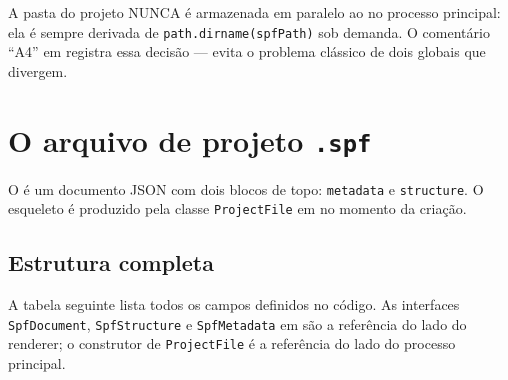 \begin{nota}
A pasta do projeto NUNCA é armazenada em paralelo ao  no processo
principal: ela é sempre derivada de \lstinline|path.dirname(spfPath)| sob
demanda. O comentário \enquote{A4} em  registra essa
decisão — evita o problema clássico de dois globais que divergem.
\end{nota}

\section{O arquivo de projeto \texttt{.spf}}
\label{sec:spf-formato}

O  é um documento JSON com dois blocos de topo: \lstinline|metadata|
e \lstinline|structure|. O esqueleto é produzido pela classe
\lstinline|ProjectFile| em  no momento da criação.

\subsection{Estrutura completa}

A tabela seguinte lista todos os campos definidos no código. As interfaces
\lstinline|SpfDocument|, \lstinline|SpfStructure| e \lstinline|SpfMetadata| em
 são a referência do lado do renderer; o construtor de
\lstinline|ProjectFile| é a referência do lado do processo principal.

